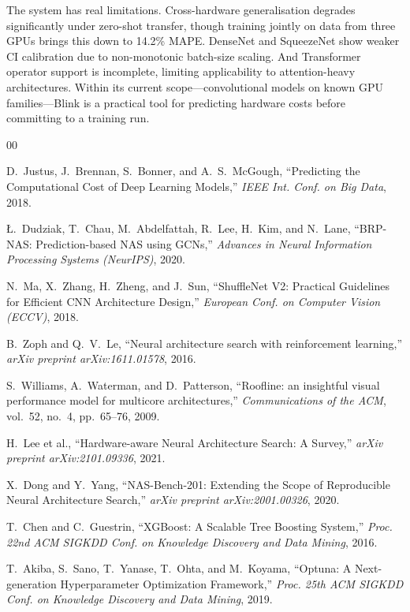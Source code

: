 \documentclass[conference]{IEEEtran}
\begin{document}
The system has real limitations. Cross-hardware generalisation degrades
significantly under zero-shot transfer, though training jointly on data from
three GPUs brings this down to 14.2\% MAPE. DenseNet and SqueezeNet show weaker
CI calibration due to non-monotonic batch-size scaling. And Transformer operator
support is incomplete, limiting applicability to attention-heavy architectures.
Within its current scope---convolutional models on known GPU families---Blink is
a practical tool for predicting hardware costs before committing to a training run.


\begin{thebibliography}{00}

D.~Justus, J.~Brennan, S.~Bonner, and A.~S.~McGough,
``Predicting the Computational Cost of Deep Learning Models,''
\textit{IEEE Int. Conf. on Big Data}, 2018.

\L.~Dudziak, T.~Chau, M.~Abdelfattah, R.~Lee, H.~Kim, and N.~Lane,
``BRP-NAS: Prediction-based NAS using GCNs,''
\textit{Advances in Neural Information Processing Systems (NeurIPS)}, 2020.

N.~Ma, X.~Zhang, H.~Zheng, and J.~Sun,
``ShuffleNet V2: Practical Guidelines for Efficient CNN Architecture Design,''
\textit{European Conf. on Computer Vision (ECCV)}, 2018.

B.~Zoph and Q.~V.~Le,
``Neural architecture search with reinforcement learning,''
\textit{arXiv preprint arXiv:1611.01578}, 2016.

S.~Williams, A.~Waterman, and D.~Patterson,
``Roofline: an insightful visual performance model for multicore architectures,''
\textit{Communications of the ACM}, vol.~52, no.~4, pp.~65--76, 2009.

H.~Lee et al.,
``Hardware-aware Neural Architecture Search: A Survey,''
\textit{arXiv preprint arXiv:2101.09336}, 2021.

X.~Dong and Y.~Yang,
``NAS-Bench-201: Extending the Scope of Reproducible Neural Architecture Search,''
\textit{arXiv preprint arXiv:2001.00326}, 2020.

T.~Chen and C.~Guestrin,
``XGBoost: A Scalable Tree Boosting System,''
\textit{Proc. 22nd ACM SIGKDD Conf. on Knowledge Discovery and Data Mining}, 2016.

T.~Akiba, S.~Sano, T.~Yanase, T.~Ohta, and M.~Koyama,
``Optuna: A Next-generation Hyperparameter Optimization Framework,''
\textit{Proc. 25th ACM SIGKDD Conf. on Knowledge Discovery and Data Mining}, 2019.


\end{thebibliography}
\end{document}
